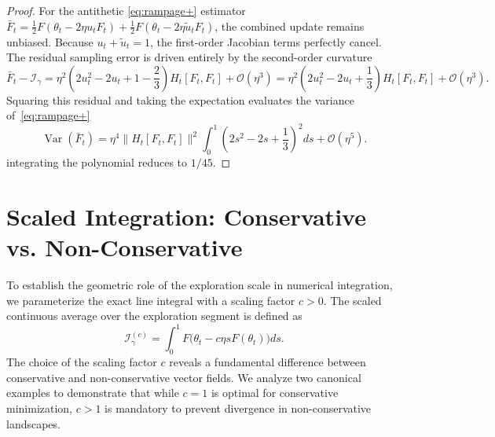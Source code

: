\documentclass[letter,11pt]{article}
\begin{document}
\begin{proof}
For the antithetic \eqref{eq:rampage+} estimator $\bar{F}_t = \frac{1}{2} F(\theta_t - 2\eta u_t F_t) + \frac{1}{2} F(\theta_t - 2\eta \tilde{u}_t F_t)$, the combined update remains unbiased. Because $u_t + \tilde{u}_t = 1$, the first-order Jacobian terms perfectly cancel. The residual sampling error is driven entirely by the second-order curvature
\begin{equation}
\bar{F}_t - \mathcal{I}_{\gamma} = \eta^2 \left( 2u_t^2 - 2u_t + 1 - \frac{2}{3} \right) H_t[F_t, F_t] + \mathcal{O}(\eta^3) = \eta^2 \left( 2u_t^2 - 2u_t + \frac{1}{3} \right) H_t[F_t, F_t] + \mathcal{O}(\eta^3).
\end{equation}
Squaring this residual and taking the expectation evaluates the variance of~\eqref{eq:rampage+}
\begin{equation}
\operatorname{Var}(\bar{F}_t) = \eta^4 \|H_t[F_t, F_t]\|^2 \int_0^1 \left( 2s^2 - 2s + \frac{1}{3} \right)^2 ds + \mathcal{O}(\eta^5).
\end{equation}
 integrating the polynomial reduces to $1/45$.
\end{proof}
\section{Scaled Integration: Conservative vs. Non-Conservative}\label{app:scale}
To establish the geometric role of the exploration scale in numerical integration, we parameterize the exact line integral with a scaling factor $c >0$. The scaled continuous average over the exploration segment is defined as
\begin{equation} \label{eq:generalized_integral}
\mathcal{I}_{\gamma}^{(c)} = \int_0^1 F\big(\theta_t - c\eta s F(\theta_t)\big) ds.
\end{equation}
The choice of the scaling factor $c$ reveals a fundamental difference between conservative and non-conservative vector fields. We analyze two canonical examples to demonstrate that while $c=1$ is optimal for conservative minimization, $c > 1$ is mandatory to prevent divergence in non-conservative landscapes.
\end{document}

